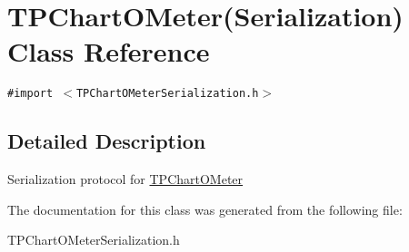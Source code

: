 \hypertarget{interface_t_p_chart_o_meter_07_serialization_08}{
\section{TPChartOMeter(Serialization) Class Reference}
\label{interface_t_p_chart_o_meter_07_serialization_08}
}
{\tt \#import $<$TPChartOMeterSerialization.h$>$}



\subsection{Detailed Description}
Serialization protocol for \hyperlink{interface_t_p_chart_o_meter}{TPChartOMeter} 

The documentation for this class was generated from the following file:\begin{CompactItemize}
\item 
TPChartOMeterSerialization.h\end{CompactItemize}
